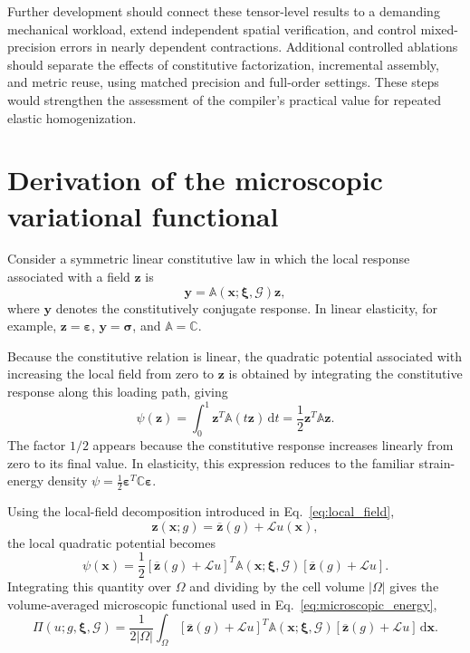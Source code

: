 \documentclass[pdflatex,sn-basic,Numbered]{sn-jnl}
\newcommand{\G}{\mathcal{G}}
\begin{document}
Further development should connect these tensor-level results to a demanding
mechanical workload, extend independent spatial verification, and control
mixed-precision errors in nearly dependent contractions. Additional
controlled ablations should separate the effects of constitutive
factorization, incremental assembly, and metric reuse, using matched
precision and full-order settings. These steps would strengthen the
assessment of the compiler's practical value for repeated elastic
homogenization.

\appendix

\section{Derivation of the microscopic variational functional}
\label{app:microscopic_functional_derivation}

Consider a symmetric linear constitutive law in which the local response
associated with a field \(\boldsymbol z\) is
\[
\boldsymbol y
=
\mathbb A(\boldsymbol x;\boldsymbol\xi,\G)\boldsymbol z,
\]
where \(\boldsymbol y\) denotes the constitutively conjugate response. In
linear elasticity, for example,
\(\boldsymbol z=\boldsymbol\varepsilon\),
\(\boldsymbol y=\boldsymbol\sigma\), and
\(\mathbb A=\mathbb C\).

Because the constitutive relation is linear, the quadratic potential
associated with increasing the local field from zero to
\(\boldsymbol z\) is obtained by integrating the constitutive response along
this loading path, giving
\[
\psi(\boldsymbol z)
=
\int_{0}^{1}
\boldsymbol z^T
\mathbb A
(t\boldsymbol z)
\,\mathrm{d}t
=
\frac{1}{2}
\boldsymbol z^T
\mathbb A
\boldsymbol z.
\]
The factor \(1/2\) appears because the constitutive response increases
linearly from zero to its final value. In elasticity, this expression reduces
to the familiar strain-energy density
\(\psi=\frac{1}{2}\boldsymbol\varepsilon^T
\mathbb C\boldsymbol\varepsilon\).

Using the local-field decomposition introduced in
Eq.~\eqref{eq:local_field},
\[
\boldsymbol z(\boldsymbol x;g)
=
\overline{\boldsymbol z}(g)
+
\mathcal L u(\boldsymbol x),
\]
the local quadratic potential becomes
\[
\psi(\boldsymbol x)
=
\frac{1}{2}
\left[
\overline{\boldsymbol z}(g)
+
\mathcal L u
\right]^T
\mathbb A(\boldsymbol x;\boldsymbol\xi,\G)
\left[
\overline{\boldsymbol z}(g)
+
\mathcal L u
\right].
\]
Integrating this quantity over \(\Omega\) and dividing by the cell volume
\(|\Omega|\) gives the volume-averaged microscopic functional used in
Eq.~\eqref{eq:microscopic_energy},
\[
\Pi(u;g,\boldsymbol\xi,\G)
=
\frac{1}{2|\Omega|}
\int_{\Omega}
\left[
\overline{\boldsymbol z}(g)
+
\mathcal L u
\right]^T
\mathbb A(\boldsymbol x;\boldsymbol\xi,\G)
\left[
\overline{\boldsymbol z}(g)
+
\mathcal L u
\right]
\,\mathrm{d}\boldsymbol x.
\]
\end{document}
